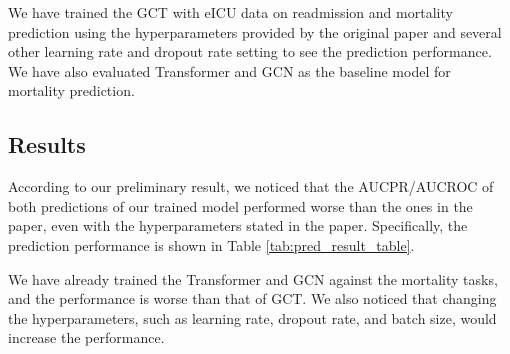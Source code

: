 \documentclass[11pt,a4paper]{article}
\begin{document}

We have trained the GCT with eICU data on readmission and mortality prediction using the hyperparameters provided by the original paper and several other learning rate and dropout rate setting to see the prediction performance. We have also evaluated Transformer and GCN as the baseline model for mortality prediction.

\subsection{Results}
According to our preliminary result, we noticed that the AUCPR/AUCROC of both predictions of our trained model performed worse than the ones in the paper, even with the hyperparameters stated in the paper. Specifically, the prediction performance is shown in Table \ref{tab:pred_result_table}.

We have already trained the Transformer and GCN against the mortality tasks, and the performance is worse than that of GCT. We also noticed that changing the hyperparameters, such as learning rate, dropout rate, and batch size, would increase the performance.
\end{document}
